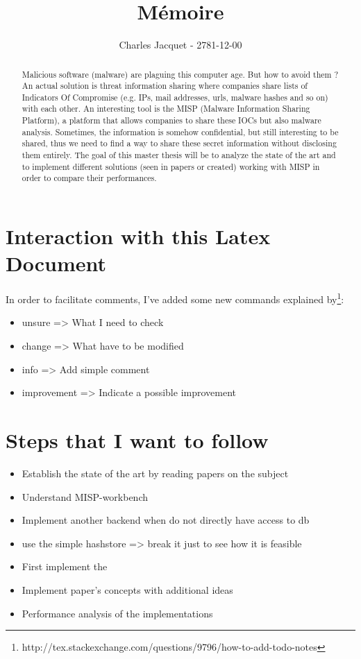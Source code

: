 \documentclass[10pt]{article}
\title{Mémoire}
\author{Charles Jacquet - 2781-12-00}
\begin{document}
\maketitle

\begin{abstract} 
Malicious software (malware) are plaguing this computer age. But how to avoid them ?
An actual solution is threat information sharing where companies share lists of Indicators Of Compromise (e.g. IPs, mail addresses, urls, malware hashes and so on) with each other.
An interesting tool is the MISP (Malware Information Sharing Platform), a platform that allows companies to share these IOCs but also malware analysis.
Sometimes, the information is somehow confidential, but still interesting to be shared, thus we need to find a way to share these secret information without disclosing them entirely.
The goal of this master thesis will be to analyze the state of the art and to implement different solutions (seen in papers or created) working with MISP in order to compare their performances.
\end{abstract}

\section{Interaction with this Latex Document}
In order to facilitate comments, I've added some new commands explained by\footnote{http://tex.stackexchange.com/questions/9796/how-to-add-todo-notes}:\\
\begin{itemize}
\item unsure => What I need to check
\item change => What have to be modified
\item info => Add simple comment
\item improvement => Indicate a possible improvement
\end{itemize}

\section{Steps that I want to follow}
\begin{itemize}
\item Establish the state of the art by reading papers on the subject
\item Understand MISP-workbench
\item Implement another backend when do not directly have access to db
\item use the simple hashstore => break it just to see how it is feasible
\item First implement the \cite{van2016private} 
\item Implement paper's concepts with additional ideas
\item Performance analysis of the implementations
\end{itemize}
\end{document}
